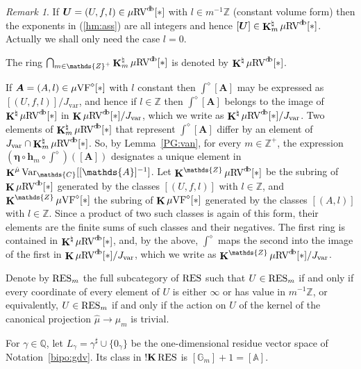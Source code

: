 \documentclass[12pt]{amsart}
\theoremstyle{plain}
\theoremstyle{definition}
\theoremstyle{remark}
\newtheorem{rem}[thm]{Remark}
\numberwithin{equation}{section}
\theoremstyle{plain}
\newcommand{\VF}{\textup{VF}}
\newcommand{\RV}{\textup{RV}}
\newcommand{\Z}{\mathds{Z}}
\newcommand{\A}{\mathds{A}}
\newcommand{\C}{\mathds{C}}
\newcommand{\G}{\mathds{G}}
\newcommand{\Q}{\mathds{Q}}
\newcommand{\0}{\emptyset}
\newcommand{\fun}{\longrightarrow}
\newcommand{\mgVF}{{\mu} {\VF}}
\newcommand{\mgRV}{{\mu}{\RV}}
\newcommand{\RES}{\textup{RES}}
\DeclareMathOperator{\ggk}{\mathbf{K}}
\DeclareMathOperator{\sggk}{!\mathbf{K}}
\DeclareMathOperator{\db}{d \! b}
\newcommand{\var}{\textup{Var}}
\newcommand{\gmv}{\ggk^{\hat \mu}\var_{\C}}
\begin{document}
\begin{rem}\label{dia:to:db:dag}
If $\bm U = (U, f, l) \in \mgRV^{\db}[*]$ with $l \in m^{-1}\Z$ (constant volume form) then the exponents in (\ref{hm:ass}) are all integers and hence $[\bm U] \in \ggk^\natural_m \mgRV^{\db}[*]$. Actually we shall only need the case $l = 0$.

The ring $\bigcap_{m \in \Z^+} \ggk^\natural_m \mgRV^{\db}[*]$ is denoted by $\ggk^\natural \mgRV^{\db}[*]$.

If $\bm A = (A, l) \in \mgVF^\diamond[*]$ with $l$  constant then $\int^\diamond [\bm A]$ may be expressed as $[(U, f, l)]/ J_{\mathrm{var}}$, and hence if $l \in \Z$ then $\int^\diamond [\bm A]$ belongs to the image of $\ggk^\natural \mgRV^{\db}[*]$ in $\ggk \mgRV^{\db}[*] / J_{\mathrm{var}}$, which we write as $\ggk^\natural \mgRV^{\db}[*]/ J_{\mathrm{var}}$. Two elements of $\ggk^\natural_m \mgRV^{\db}[*]$ that represent $\int^\diamond [\bm A]$ differ by an element of $J_{\mathrm{var}} \cap \ggk^\natural_m \mgRV^{\db}[*]$. So, by Lemma~\ref{PG:van}, for every $m \in \Z^+$, the expression $(\bm \eta \circ \bm h_m \circ \int^\diamond)([\bm A])$ designates a unique element  in $\gmv[[\A]^{-1}]$.
Let $\ggk^{\Z} \mgRV^{\db}[*]$ be the subring of $\ggk \mgRV^{\db}[*]$ generated by the classes $[(U, f, l)]$ with $l \in \Z$, and $\ggk^{\Z} \mgVF^\diamond[*]$ the subring of $\ggk \mgVF^\diamond[*]$ generated by the classes $[(A, l)]$ with $l \in \Z$. Since a product of two such classes is again of this form, their elements are the finite sums of such classes and their negatives. The first ring is contained in $\ggk^\natural \mgRV^{\db}[*]$, and, by the above, $\int^\diamond$ maps the second into the image of the first in $\ggk \mgRV^{\db}[*]/J_{\mathrm{var}}$, which we write as $\ggk^{\Z} \mgRV^{\db}[*]/J_{\mathrm{var}}$.
\end{rem}


Denote by $\RES_{m}$ the full subcategory of $\RES$ such that $U \in \RES_{m}$ if and only if every coordinate of every element of $U$ is either $\infty$ or has value in $m^{-1} \Z$, or equivalently, $U \in \RES_{m}$ if and only if the action on $U$ of the kernel of the canonical projection $\hat \mu \fun \mu_m$ is trivial.

For $\gamma \in \Q$, let $L_\gamma = \gamma^\sharp \cup \{0_\gamma\}$ be the one-dimensional residue vector space of Notation~\ref{bipo:gdv}. Its class in $\sggk \RES$ is $[\G_m] + 1 = [\A]$.
\end{document}
